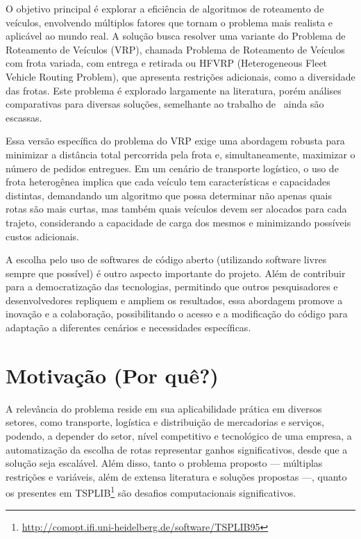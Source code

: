 \documentclass[
    openany,
    12pt,
    a4paper,
    twoside,
    english,
    brazil, sumario=tradicional
]{/home/lucas_galdino/Desktop/TCC/planning/abntex2/abntex2}
\begin{document}
O objetivo principal é explorar a eficiência de algoritmos de roteamento de veículos, envolvendo múltiplos fatores que tornam o problema mais realista e aplicável ao mundo real. A solução busca resolver uma variante do Problema de Roteamento de Veículos (VRP), chamada Problema de Roteamento de Veículos com frota variada, com entrega e retirada ou HFVRP (Heterogeneous Fleet Vehicle Routing Problem), que apresenta restrições adicionais, como a diversidade das frotas. Este problema é explorado largamente na literatura, porém análises comparativas para diversas soluções, semelhante ao trabalho de~\citeauthor{voudouris_tsp_comparison} ainda são escassas.

Essa versão específica do problema do VRP exige uma abordagem robusta para minimizar a distância total percorrida pela frota e, simultaneamente, maximizar o número de pedidos entregues. Em um cenário de transporte logístico, o uso de frota heterogênea implica que cada veículo tem características e capacidades distintas, demandando um algoritmo que possa determinar não apenas quais rotas são mais curtas, mas também quais veículos devem ser alocados para cada trajeto, considerando a capacidade de carga dos mesmos e minimizando possíveis custos adicionais.

A escolha pelo uso de softwares de código aberto (utilizando software livres sempre que possível) é outro aspecto importante do projeto. Além de contribuir para a democratização das tecnologias, permitindo que outros pesquisadores e desenvolvedores repliquem e ampliem os resultados, essa abordagem promove a inovação e a colaboração, possibilitando o acesso e a modificação do código para adaptação a diferentes cenários e necessidades específicas.

\chapter{Motivação (Por quê?)}

A relevância do problema reside em sua aplicabilidade prática em diversos setores, como transporte, logística e distribuição de mercadorias e serviços, podendo, a depender do setor, nível competitivo e tecnológico de uma empresa, a automatização da escolha de rotas representar ganhos significativos, desde que a solução seja escalável. Além disso, tanto o problema proposto — múltiplas restrições e variáveis, além de extensa literatura e soluções propostas —, quanto os presentes em TSPLIB\footnote{\url{http://comopt.ifi.uni-heidelberg.de/software/TSPLIB95}} são desafios computacionais significativos.
\end{document}
